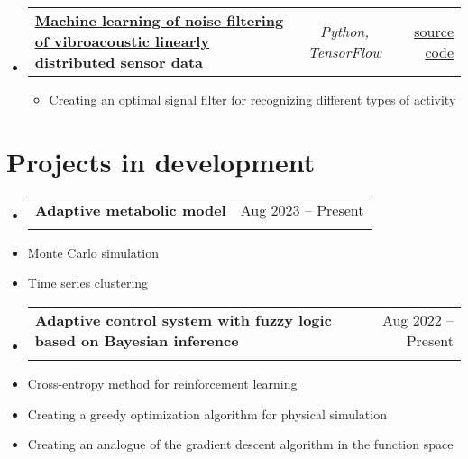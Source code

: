 \documentclass[a4paper,11pt]{article}
\makeatletter
\newcommand{\resumeItem}[1]{
  \item\small{#1}
}
\newcommand{\resumeItemListStart}{\begin{itemize}[rightmargin=0.11in]}
\newcommand{\resumeItemListEnd}{\end{itemize}}
\newcommand{\resumeTrioHeading}[3]{
  \item\small{
    \begin{tabular*}{0.96\textwidth}[t]{
      l@{\extracolsep{\fill}}c@{\extracolsep{\fill}}r
    }
      \textbf{#1} & \textit{#2} & #3
    \end{tabular*}
  }
}
\newcommand{\resumeQuadHeading}[4]{
  \item
  \begin{tabular*}{0.96\textwidth}[t]{l@{\extracolsep{\fill}}r}
    \textbf{#1} & #2 \\
    \textit{\small#3} & \textit{\small #4} \\
  \end{tabular*}
}
\newcommand{\resumeHeadingListStart}{
  \begin{itemize}[leftmargin=0.15in, label={}]
}
\newcommand{\resumeHeadingListEnd}{\end{itemize}}
\makeatother
\begin{document}
\resumeHeadingListStart{}
    \resumeTrioHeading{\href{https://drive.google.com/drive/u/0/folders/1q2EaWoaNGiwG4w1tQbm2k_c_2cM4j4Uv}{\uline{Machine learning of noise filtering of vibroacoustic linearly distributed sensor data}}}{Python, TensorFlow}{\href{https://github.com/RepnikovPavel/kursach_filtr_of_signal}{\uline{source code}}}
        \resumeItemListStart{}
          \resumeItem{Creating an optimal signal filter for recognizing different types of activity}
        \resumeItemListEnd{}
    \resumeHeadingListEnd






\section{Projects in development}  

\resumeHeadingListStart{}
\resumeQuadHeading{Adaptive metabolic model}{Aug 2023 -- Present}{}{}
\resumeHeadingListEnd

\resumeItemListStart{}
\resumeItem{Monte Carlo simulation}
\resumeItem{Time series clustering}
\resumeItemListEnd

\resumeHeadingListStart{}
\resumeQuadHeading{Adaptive control system with fuzzy logic based on Bayesian inference}{Aug 2022 -- Present}{}{}
\resumeHeadingListEnd

\resumeItemListStart{}
\resumeItem{Cross-entropy method for reinforcement learning}
\resumeItem{Creating a greedy optimization algorithm for physical simulation}
\resumeItem{Creating an analogue of the gradient descent algorithm in the function space}
\resumeItemListEnd{}
\end{document}

